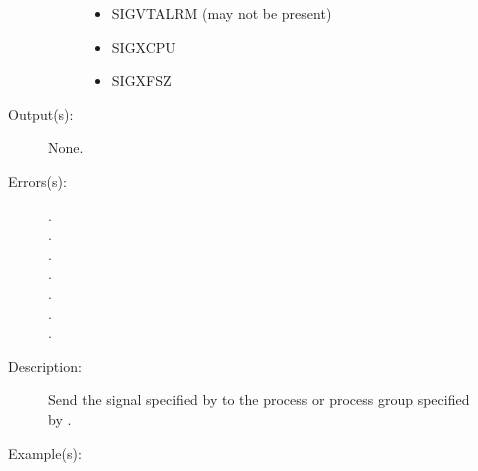 \begin{description}
\begin{description}
\begin{description}
\begin{itemize}
			\item{SIGVTALRM (may not be present)}
			\item{SIGXCPU}
			\item{SIGXFSZ}
			\end{itemize}
		\end{description}
	\item[Output(s): ] None.
	\item[Errors(s): ]
		\begin{description}\item[]
		\item[.]
		\item[.]
		\item[.]
		\item[.]
		\item[.]
		\item[.]
		\item[.]
		\end{description}
	\item[Description: ]
		Send the signal specified by  to the process or
		process group specified by .
	\item[Example(s): ]\begin{verbatim}


\end{verbatim}
\end{description}
\end{description}
